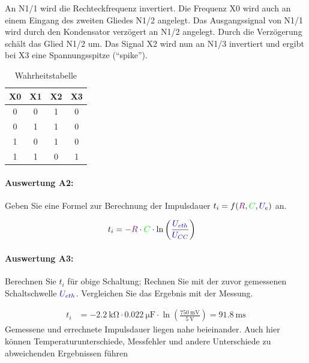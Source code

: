 \documentclass[11pt,a4paper,titlepage]{scrreprt}
\begin{document}
            An N1/1 wird die Rechteckfrequenz invertiert. Die Frequenz X0 wird auch an einem Eingang des zweiten Gliedes N1/2 angelegt. Das Ausgangssignal von N1/1 wird durch den Kondensator verzögert an N1/2 angelegt. Durch die Verzögerung schält das Glied N1/2 um. Das Signal X2 wird nun an N1/3 invertiert und ergibt bei X3 eine Spannungsspitze ("`spike"').
              \begin{center}
                \begin{table}[!hbtp]
                    \caption{Wahrheitstabelle}
                    \renewcommand{\arraystretch}{1.3}
                    \begin{center}
                        \begin{tabular}{cccc}
                            X0 & X1 & X2 & X3\\ \hline
                            0 & 0 & 1 & 0\\
                            0 & 1 & 1 & 0\\
                            1 & 0 & 1 & 0\\
                            1 & 1 & 0 & 1
                        \end{tabular}
                    \end{center}
                \end{table}
            \end{center}

          
        \paragraph{Auswertung A2:} Geben Sie eine Formel zur Berechnung der Impulsdauer $t_i = f(\textcolor{violet}{R}, \textcolor{green}{C}, \textcolor{blue}{U_e})$ an.

          \begin{align*}
              t_i &= -\textcolor{violet}{R} \cdot \textcolor{green}{C} \cdot  \ln\left(\frac{\textcolor{blue}{U_{eth}}}{\textcolor{blue}{U_{CC}}}\right)
          \end{align*}

        \paragraph{Auswertung A3:} Berechnen Sie $t_i$ für obige Schaltung; Rechnen Sie mit der zuvor gemessenen
          Schaltschwelle $\textcolor{blue}{U_{eth}}$. Vergleichen Sie das Ergebnis mit der Messung.

          \begin{align*}
          t_i &= -\SI{2,2}{\kilo\ohm} \cdot \SI{0,022}{\micro\farad} \cdot  \ln\left(\frac{\SI{750}{\milli\volt}}{\SI{5}{\volt}}\right) = \SI{91,8}{\milli\second}
          \end{align*}
           Gemessene und errechnete Impulsdauer liegen nahe beieinander. Auch hier können Temperaturunterschiede, Messfehler und andere Unterschiede zu abweichenden Ergebnissen führen
\end{document}
